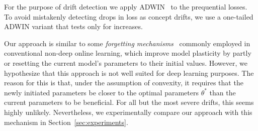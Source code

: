 \documentclass[letterpaper]{article} %
\begin{document}
For the purpose of drift detection we apply ADWIN~\cite{bifetLearningTimeChangingData2007} to the prequential losses.
To avoid mistakenly detecting drops in loss as concept drifts, we use a one-tailed ADWIN variant that tests only for increases.


Our approach is similar to some \textit{forgetting mechanisms}~\cite{gamaSurveyConceptDrift2014} commonly employed in conventional non-deep online learning, which improve model plasticity by partly~\cite{bifetAdaptiveLearningEvolving2009} or resetting the current model's parameters to their initial values.
However, we hypothesize that this approach is not well suited for deep learning purposes.
The reason for this is that, under the assumption of convexity, it requires that the newly initiated parameters be closer to the optimal parameters $\theta^*$ than the current parameters to be beneficial.
For all but the most severe drifts, this seems highly unlikely.
Nevertheless, we experimentally compare our approach with this mechanism in Section~\ref{sec:experiments}.

\end{document}
